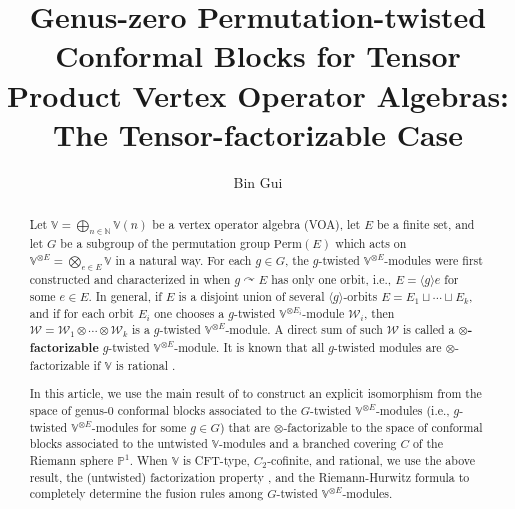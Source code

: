 \documentclass[11pt,b5paper,notitlepage]{article}
\title{Genus-zero Permutation-twisted Conformal Blocks for Tensor Product Vertex Operator Algebras: The Tensor-factorizable Case}
\author{{\sc Bin Gui}
}
\date{}
\theoremstyle{definition}
\theoremstyle{plain}
\newcommand{\mc}{\mathcal}
\newcommand{\bk}[1]{\langle {#1}\rangle}
\newcommand{\Vbb}{\mathbb V}
\newcommand{\Nbb}{\mathbb N}
\newcommand{\Pbb}{\mathbb P}
\newcommand{\Perm}{\mathrm{Perm}}
\numberwithin{equation}{subsection}
\begin{document}
\sloppy %
	\setcounter{section}{-1}
	
	
	
	\maketitle
	
	
\newcommand\blfootnote[1]{%
	\begingroup
	\renewcommand\thefootnote{}\footnote{#1}%
	\addtocounter{footnote}{-1}%
	\endgroup
}



\begin{abstract}
Let $\Vbb=\bigoplus_{n\in\Nbb}\Vbb(n)$ be a  vertex operator algebra (VOA),  let $E$ be a finite set, and let $G$ be a subgroup of the permutation group $\Perm(E)$ which acts on $\Vbb^{\otimes E}=\bigotimes_{e\in E}\Vbb$ in a natural way. For each $g\in G$, the $g$-twisted $\Vbb^{\otimes E}$-modules were first constructed and characterized in \cite{BDM02} when $g\curvearrowright E$ has only one orbit, i.e., $E=\bk{g}e$ for some $e\in E$. In general, if $E$ is a disjoint union of several $\bk{g}$-orbits $E=E_1\sqcup\cdots\sqcup E_k$, and if for each orbit $E_i$  one chooses a $g$-twisted $\Vbb^{\otimes E_i}$-module $\mc W_i$, then $\mc W=\mc W_1\otimes\cdots\otimes\mc W_k$ is a $g$-twisted $\Vbb^{\otimes E}$-module. A direct sum of such $\mc W$ is called  a \textbf{$\otimes$-factorizable} $g$-twisted $\Vbb^{\otimes E}$-module. It is known that  all $g$-twisted modules are $\otimes$-factorizable if $\Vbb$ is rational \cite{BDM02}.

In this article, we use the main result of \cite{Gui24b} to construct an explicit isomorphism from the space of genus-$0$ conformal blocks associated to the  $G$-twisted $\Vbb^{\otimes E}$-modules (i.e., $g$-twisted $\Vbb^{\otimes E}$-modules for some $g\in G$) that are $\otimes$-factorizable to the space of conformal blocks associated to the untwisted $\Vbb$-modules and a branched covering $C$ of the Riemann sphere $\Pbb^1$. When $\Vbb$ is CFT-type, $C_2$-cofinite, and rational, we use the above result, the (untwisted) factorization property \cite{DGT22}, and the Riemann-Hurwitz formula to completely determine the fusion rules among $G$-twisted $\Vbb^{\otimes E}$-modules. 


\end{abstract}
\end{document}
